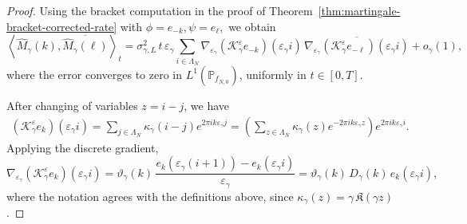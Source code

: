 \documentclass{article}
\begin{document}
\begin{proof}
Using the bracket computation in the proof of
Theorem~\ref{thm:martingale-bracket-corrected-rate} with
\(
\phi=e_{-k},
\psi=e_{\ell},
\)
we obtain
\[
\left\langle \widehat M_\gamma(k),\overline{\widehat M_\gamma(\ell)}\right\rangle_t
=
\sigma_{\gamma,L}^2\,t\,
\varepsilon_\gamma\sum_{i\in\Lambda_N}
\nabla_{\varepsilon_\gamma}(\mathcal K_\gamma^\varepsilon e_{-k})(\varepsilon_\gamma i)\,
\overline{\nabla_{\varepsilon_\gamma}(\mathcal K_\gamma^\varepsilon e_{-\ell})(\varepsilon_\gamma i)}
+
o_\gamma(1),
\]
where the error converges to zero in \(L^1(\mathbb P_{f_{N,0}})\), uniformly in \(t\in[0,T]\).


After changing of variables \(z=i-j\), we have
\begin{align*}
    (\mathcal K_\gamma^\varepsilon e_k)(\varepsilon_\gamma i) = \sum_{j\in\Lambda_N}\kappa_\gamma(i-j)e^{2\pi i k\varepsilon_\gamma j} = 
\left(
\sum_{z\in\Lambda_N}\kappa_\gamma(z)e^{-2\pi i k\varepsilon_\gamma z}
\right)
e^{2\pi i k\varepsilon_\gamma i}.
\end{align*}
Applying the discrete gradient,
\[
\nabla_{\varepsilon_\gamma}(\mathcal K_\gamma^\varepsilon e_k)(\varepsilon_\gamma i)
=
\vartheta_\gamma(k)\,
\frac{e_k(\varepsilon_\gamma(i+1))-e_k(\varepsilon_\gamma i)}{\varepsilon_\gamma}
=
\vartheta_\gamma(k)\,D_\gamma(k)\,e_k(\varepsilon_\gamma i),
\]
where the notation agrees with the definitions above, since
\(\kappa_\gamma(z)=\gamma\,\mathfrak K(\gamma z)\).


\end{proof}
\end{document}
